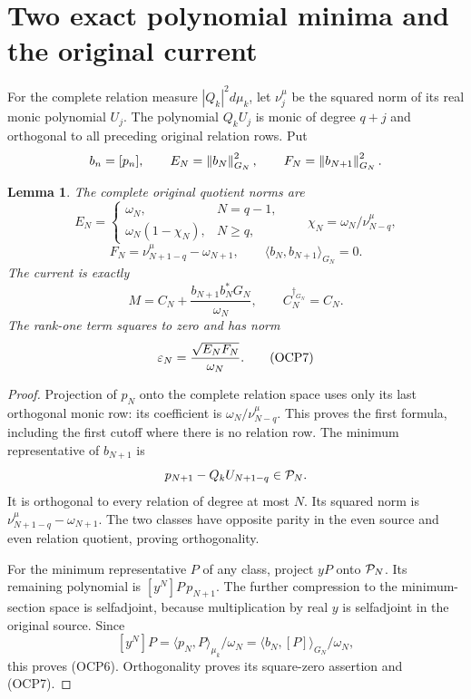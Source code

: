 \documentclass[10pt]{article}
\newtheorem{lemma}[theorem]{Lemma}
\begin{document}
\section{Two exact polynomial minima and the original current}
For the complete relation measure $|Q_k|^2d\mu_k$, let $\nu_j^\mu$ be the squared norm of its real monic polynomial $U_j$. The polynomial $Q_kU_j$ is monic of degree $q+j$ and orthogonal to all preceding original relation rows. Put
\[
 b_n=[p_n],\qquad E_N=\left\lVert b_N\right\rVert_{G_N}^2,\qquad
 F_N=\left\lVert b_{N+1}\right\rVert_{G_N}^2.
\]
\begin{lemma}
The complete original quotient norms are
\[
 E_N=\begin{cases}\omega_N,&N=q-1,\\
 \omega_N(1-\chi_N),&N\ge q,\end{cases}
 \qquad \chi_N=\omega_N/\nu_{N-q}^\mu,
\]
\[
 F_N=\nu_{N+1-q}^\mu-\omega_{N+1},\qquad
 \langle b_N,b_{N+1}\rangle_{G_N}=0.
 \tag{OCP5}
\]
The current is exactly
\[
 M=C_N+\frac{b_{N+1}b_N^*G_N}{\omega_N},\qquad
 C_N^{\dagger_{G_N}}=C_N.
 \tag{OCP6}
\]
The rank-one term squares to zero and has norm
\[
 \varepsilon_N=\frac{\sqrt{E_NF_N}}{\omega_N}.
 \tag{OCP7}
\]
\end{lemma}
\begin{proof}
Projection of $p_N$ onto the complete relation space uses only its last orthogonal monic row: its coefficient is $\omega_N/\nu_{N-q}^\mu$. This proves the first formula, including the first cutoff where there is no relation row. The minimum representative of $b_{N+1}$ is
\[
 p_{N+1}-Q_kU_{N+1-q}\in\mathcal P_N.
\]
It is orthogonal to every relation of degree at most $N$. Its squared norm is $\nu_{N+1-q}^\mu-\omega_{N+1}$. The two classes have opposite parity in the even source and even relation quotient, proving orthogonality.

For the minimum representative $P$ of any class, project $yP$ onto $\mathcal P_N$. Its remaining polynomial is $[y^N]P\,p_{N+1}$. The further compression to the minimum-section space is selfadjoint, because multiplication by real $y$ is selfadjoint in the original source. Since
\[
 [y^N]P=\langle p_N,P\rangle_{\mu_k}/\omega_N
 =\langle b_N,[P]\rangle_{G_N}/\omega_N,
\]
this proves (OCP6). Orthogonality proves its square-zero assertion and (OCP7).
\end{proof}
\end{document}

